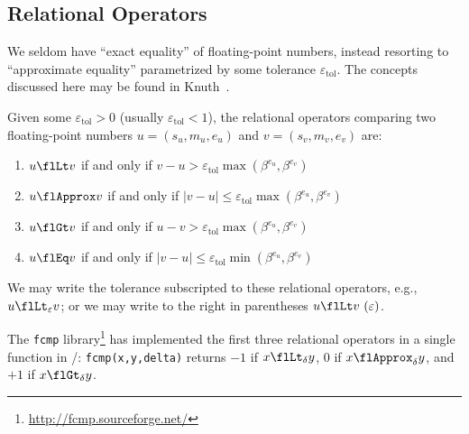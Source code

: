 \subsection{Relational Operators}

We seldom have ``exact equality'' of floating-point numbers, instead
resorting to ``approximate equality'' parametrized by some tolerance
$\varepsilon_{\text{tol}}$. The concepts discussed here may be found in Knuth~\cite{taocp2}.

\begin{defn}
  Given some $\varepsilon_{\text{tol}}>0$ (usually $\varepsilon_{\text{tol}}<1$),
  the relational operators comparing two floating-point numbers
  $u=(s_{u},m_{u},e_{u})$ and $v=(s_{v},m_{v},e_{v})$ are:
  \begin{enumerate}
  \item {} $u\flLt v$ if and only if
    $v-u > \varepsilon_{\text{tol}}\max(\beta^{e_{u}},\beta^{e_{v}})$
  \item {} $u\flApprox v$ if and only if
    $|v-u|\leq\varepsilon_{\text{tol}}\max(\beta^{e_{u}},\beta^{e_{v}})$
  \item {} $u\flGt v$ if and only if
    $u-v > \varepsilon_{\text{tol}}\max(\beta^{e_{u}},\beta^{e_{v}})$
  \item {} $u\flEq v$ if and only if
    $|v-u|\leq\varepsilon_{\text{tol}}\min(\beta^{e_{u}},\beta^{e_{v}})$
  \end{enumerate}
\end{defn}
\begin{notation}
  We may write the tolerance subscripted to these relational operators,
  e.g., $u\flLt_{\varepsilon}v$; or we may write to the right in
  parentheses $u\flLt v~(\varepsilon)$.
\end{notation}

\begin{rmk}
  The {\tt fcmp} library\footnote{\url{http://fcmp.sourceforge.net/}} has implemented the first three relational
  operators in a single function in \CEE/: \verb|fcmp(x,y,delta)| returns $-1$
  if $x\flLt_{\delta} y$, 0 if $x\flApprox_{\delta} y$, and $+1$ if $x\flGt_{\delta} y$.
\end{rmk}


